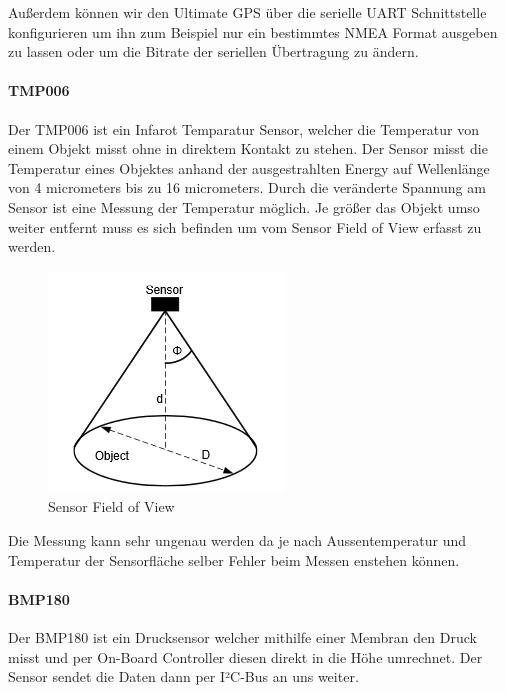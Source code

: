 Außerdem können wir den Ultimate GPS über die serielle UART Schnittstelle konfigurieren um ihn zum Beispiel nur ein bestimmtes NMEA Format ausgeben zu lassen oder um die Bitrate der seriellen Übertragung zu ändern.

\paragraph{TMP006}
Der TMP006 ist ein Infarot Temparatur Sensor, welcher die Temperatur von einem Objekt misst ohne in direktem Kontakt zu stehen. Der Sensor misst die Temperatur eines Objektes anhand der ausgestrahlten Energy auf Wellenlänge von 4 micrometers bis zu 16 micrometers. Durch die veränderte Spannung am Sensor ist eine Messung der Temperatur möglich. Je größer das Objekt umso weiter entfernt muss es sich befinden um vom Sensor Field of View erfasst zu werden.

\begin{figure}[h]
	\centering
	\includegraphics[scale=0.5]{2_Beschreibung_des_CANSAT/sensor_fov.png}
	\caption{Sensor Field of View}
	\label{sensor fov}
\end{figure}

Die Messung kann sehr ungenau werden da je nach Aussentemperatur und Temperatur der Sensorfläche selber Fehler beim Messen enstehen können.

\paragraph{BMP180}
Der BMP180 ist ein Drucksensor welcher mithilfe einer Membran den Druck misst und per On-Board Controller diesen direkt in die Höhe umrechnet. Der Sensor sendet die Daten dann per I²C-Bus an uns weiter.

